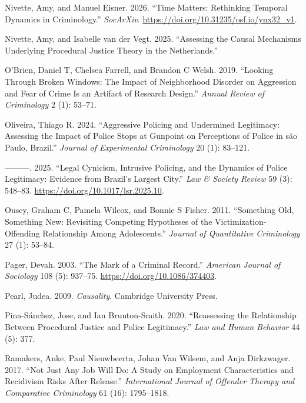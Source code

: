 \documentclass[
  letterpaper,
  DIV=11,
  numbers=noendperiod]{scrartcl}
\newlength{\cslhangindent}
\newenvironment{CSLReferences}[2] %
 {\begin{list}{}{%
  \setlength{\itemindent}{0pt}
  \setlength{\leftmargin}{0pt}
  \setlength{\parsep}{0pt}
  \ifodd #1
   \setlength{\leftmargin}{\cslhangindent}
   \setlength{\itemindent}{-1\cslhangindent}
  \fi
  \setlength{\itemsep}{#2\baselineskip}}}
 {\end{list}}
\begin{document}
\begin{CSLReferences}{1}{0}
Nivette, Amy, and Manuel Eisner. 2026. {``Time Matters: Rethinking
Temporal Dynamics in Criminology.''} \emph{SocArXiv}.
\url{https://doi.org/10.31235/osf.io/ynx32_v1}.

Nivette, Amy, and Isabelle van der Vegt. 2025. {``Assessing the Causal
Mechanisms Underlying Procedural Justice Theory in the Netherlands.''}

O'Brien, Daniel T, Chelsea Farrell, and Brandon C Welsh. 2019.
{``Looking Through Broken Windows: The Impact of Neighborhood Disorder
on Aggression and Fear of Crime Is an Artifact of Research Design.''}
\emph{Annual Review of Criminology} 2 (1): 53--71.

Oliveira, Thiago R. 2024. {``Aggressive Policing and Undermined
Legitimacy: Assessing the Impact of Police Stops at Gunpoint on
Perceptions of Police in s{ã}o Paulo, Brazil.''} \emph{Journal of
Experimental Criminology} 20 (1): 83--121.

---------. 2025. {``Legal Cynicism, Intrusive Policing, and the Dynamics
of Police Legitimacy: Evidence from Brazil{'}s Largest City.''}
\emph{Law \& Society Review} 59 (3): 548--83.
\url{https://doi.org/10.1017/lsr.2025.10}.

Ousey, Graham C, Pamela Wilcox, and Bonnie S Fisher. 2011. {``Something
Old, Something New: Revisiting Competing Hypotheses of the
Victimization-Offending Relationship Among Adolescents.''} \emph{Journal
of Quantitative Criminology} 27 (1): 53--84.

Pager, Devah. 2003. {``The Mark of a Criminal Record.''} \emph{American
Journal of Sociology} 108 (5): 937--75.
\url{https://doi.org/10.1086/374403}.

Pearl, Judea. 2009. \emph{Causality}. Cambridge University Press.

Pina-Sánchez, Jose, and Ian Brunton-Smith. 2020. {``Reassessing the
Relationship Between Procedural Justice and Police Legitimacy.''}
\emph{Law and Human Behavior} 44 (5): 377.

Ramakers, Anke, Paul Nieuwbeerta, Johan Van Wilsem, and Anja Dirkzwager.
2017. {``Not Just Any Job Will Do: A Study on Employment Characteristics
and Recidivism Risks After Release.''} \emph{International Journal of
Offender Therapy and Comparative Criminology} 61 (16): 1795--1818.


\end{CSLReferences}
\end{document}
